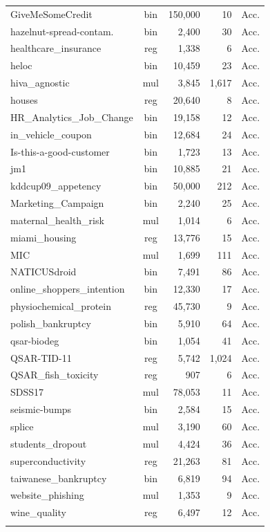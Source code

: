 \documentclass[sigconf,screen]{acmart}
\begin{document}
\begin{table}[t]
\begin{tabular}[t]{@{}l c r r c@{}}
GiveMeSomeCredit & bin & 150,000 & 10 & Acc. \\
hazelnut-spread-contam. & bin & 2,400 & 30 & Acc. \\
healthcare\_insurance & reg & 1,338 & 6 & Acc. \\
heloc & bin & 10,459 & 23 & Acc. \\
hiva\_agnostic & mul & 3,845 & 1,617 & Acc. \\
houses & reg & 20,640 & 8 & Acc. \\
HR\_Analytics\_Job\_Change & bin & 19,158 & 12 & Acc. \\
in\_vehicle\_coupon & bin & 12,684 & 24 & Acc. \\
Is-this-a-good-customer & bin & 1,723 & 13 & Acc. \\
jm1 & bin & 10,885 & 21 & Acc. \\
kddcup09\_appetency & bin & 50,000 & 212 & Acc. \\
Marketing\_Campaign & bin & 2,240 & 25 & Acc. \\
maternal\_health\_risk & mul & 1,014 & 6 & Acc. \\
miami\_housing & reg & 13,776 & 15 & Acc. \\
MIC & mul & 1,699 & 111 & Acc. \\
NATICUSdroid & bin & 7,491 & 86 & Acc. \\
online\_shoppers\_intention & bin & 12,330 & 17 & Acc. \\
physiochemical\_protein & reg & 45,730 & 9 & Acc. \\
polish\_bankruptcy & bin & 5,910 & 64 & Acc. \\
qsar-biodeg & bin & 1,054 & 41 & Acc. \\
QSAR-TID-11 & reg & 5,742 & 1,024 & Acc. \\
QSAR\_fish\_toxicity & reg & 907 & 6 & Acc. \\
SDSS17 & mul & 78,053 & 11 & Acc. \\
seismic-bumps & bin & 2,584 & 15 & Acc. \\
splice & mul & 3,190 & 60 & Acc. \\
students\_dropout & mul & 4,424 & 36 & Acc. \\
superconductivity & reg & 21,263 & 81 & Acc. \\
taiwanese\_bankruptcy & bin & 6,819 & 94 & Acc. \\
website\_phishing & mul & 1,353 & 9 & Acc. \\
wine\_quality & reg & 6,497 & 12 & Acc. \\\\

\end{tabular}
\end{table}
\end{document}
